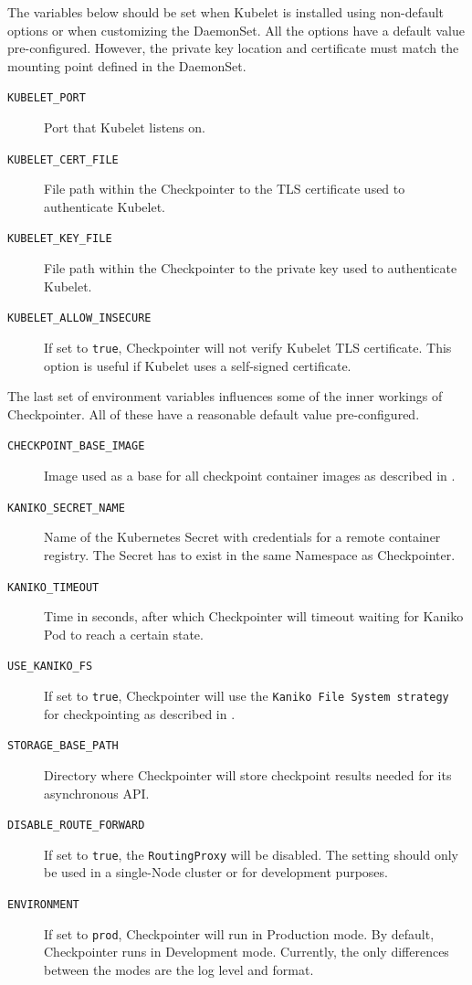 \documentclass[
  digital,     %
  oneside,     %
  nosansbold,  %
  nocolorbold, %
  lof,         %
  nolot,         %
]{fithesis4}
\begin{document}
The variables below should be set when Kubelet is installed using non-default options or when customizing the DaemonSet. All the options have a default value pre-configured. However, the private key location and certificate must match the mounting point defined in the DaemonSet.
\begin{description}
    \item[\texttt{KUBELET\_PORT}] Port that Kubelet listens on.
    \item[\texttt{KUBELET\_CERT\_FILE}] File path within the Checkpointer to the TLS certificate used to authenticate Kubelet.
    \item[\texttt{KUBELET\_KEY\_FILE}] File path within the Checkpointer to the private key used to authenticate Kubelet.
    \item[\texttt{KUBELET\_ALLOW\_INSECURE}] If set to \texttt{true}, Checkpointer will not verify Kubelet TLS certificate. This option is useful if Kubelet uses a self-signed certificate.
\end{description}

The last set of environment variables influences some of the inner workings of Checkpointer. All of these have a reasonable default value pre-configured.
\begin{description}
    \item[\texttt{CHECKPOINT\_BASE\_IMAGE}] Image used as a base for all checkpoint container images as described in .
    \item[\texttt{KANIKO\_SECRET\_NAME}] Name of the Kubernetes Secret with credentials for a remote container registry. The Secret has to exist in the same Namespace as Checkpointer.
    \item[\texttt{KANIKO\_TIMEOUT}] Time in seconds, after which Checkpointer will timeout waiting for Kaniko Pod to reach a certain state.
    \item[\texttt{USE\_KANIKO\_FS}] If set to \texttt{true}, Checkpointer will use the \texttt{Kaniko File System strategy} for checkpointing as described in .
    \item[\texttt{STORAGE\_BASE\_PATH}] Directory where Checkpointer will store checkpoint results needed for its asynchronous API.
    \item[\texttt{DISABLE\_ROUTE\_FORWARD}] If set to \texttt{true}, the \texttt{RoutingProxy} will be disabled. The setting should only be used in a single-Node cluster or for development purposes.
     \item[\texttt{ENVIRONMENT}] If set to \texttt{prod}, Checkpointer will run in Production mode. By default, Checkpointer runs in Development mode. Currently, the only differences between the modes are the log level and format.
\end{description}
\end{document}
